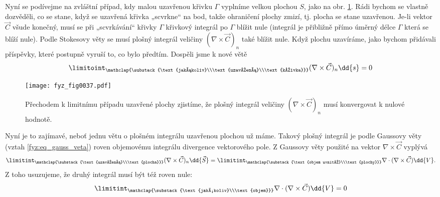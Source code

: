        
    Nyní se podívejme na zvláštní případ, kdy malou uzavřenou křivku \(\Gamma\) vyplníme velkou 
    plochou \(S\), jako na obr. \ref{fyz:fig0037}. Rádi bychom se vlastně dozvěděli, co se 
    stane, když se uzavřená křivka „scvrkne“ na bod, takže ohraničení plochy zmizí, tj. plocha se 
    stane uzavřenou. Je-li vektor \(\vec{C}\) všude konečný, musí se při „scvrkávání“ křivky 
    \(\Gamma\) křivkový integrál po \(\Gamma\) blížit nule (integrál je přibližně přímo úměrný 
    délce \(\Gamma\) která se blíží nule). Podle Stokesovy věty se musí plošný integrál veličiny 
    \((\nabla\times\vec{C})_n\) také blížit nule. Když plochu uzavíráme, jako bychom přidávali 
    příspěvky, které postupně vyruší to, co bylo předtím. Dospěli jsme k nové větě
    \begin{equation}\label{fyz:eq_fey_null1} 
      \limitoint_{\mathclap{\substack{\text{jakákoliv}\\\text{uzavřená}\\\text{křivka}}}}
       (\nabla\times\vec{C})_n \dd{s} = 0
    \end{equation}

    \begin{figure}[ht!]  %
      \centering
      \texttt{[image: fyz\_fig0037.pdf]}
      \caption{Přechodem k limitnímu případu uzavřené plochy zjistíme, že plošný integrál veličiny
               \((\nabla\times\vec{C})_n\) musí konvergovat k nulové hodnotě.
               \cite[s.~60]{Feynman02}}
      \label{fyz:fig0037}
    \end{figure}
    Nyní je to zajímavé, neboť jednu větu o plošném integrálu uzavřenou plochou už máme. Takový 
    plošný integrál je podle Gaussovy věty (vztah \ref{fyz:eq_gauss_veta}) roven objemovému 
    integrálu divergence vektorového pole. Z Gaussovy věty použité na vektor 
    \(\nabla\times\vec{C}\) vyplývá
    \begin{equation}\label{fyz:eq_fey_null2} 
      \limitint_{\mathclap{\substack{\text{uzavřená}\\\text{plocha}}}}
       (\nabla\times\vec{C})_n \dd{\vec{S}}
      =
      \limitint_{\mathclap{\substack{\text{objem uvnitř}\\\text{plochy}}}}
        \nabla\cdot(\nabla\times\vec{C})\dd{V}.
    \end{equation}
    Z toho usuzujeme, že druhý integrál musí být též roven nule:
    \begin{equation}\label{fyz:eq_fey_null3} 
     \limitint_{\mathclap{\substack{\text{jakýkoliv}\\\text{objem}}}}
      \nabla\cdot(\nabla\times\vec{C})\dd{V} = 0
    \end{equation}
            
